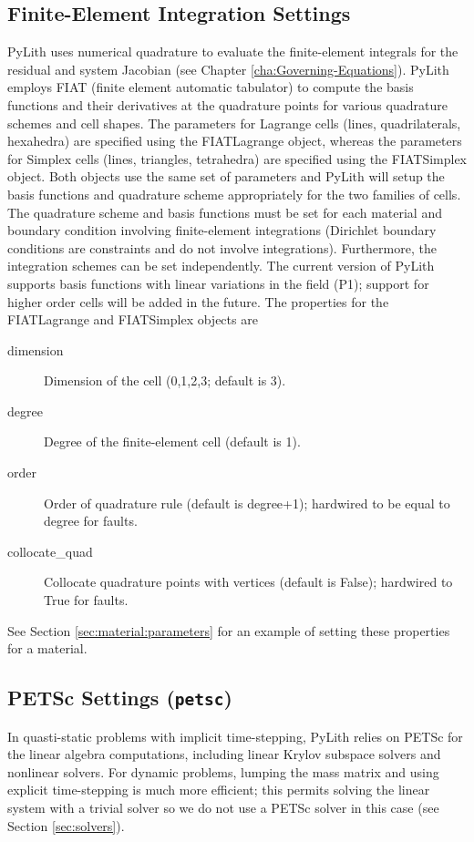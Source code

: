 \subsection{Finite-Element Integration Settings}

PyLith uses numerical quadrature to evaluate the finite-element integrals
for the residual and system Jacobian (see Chapter \vref{cha:Governing-Equations}).
PyLith employs FIAT (finite element automatic tabulator) to compute
the basis functions and their derivatives at the quadrature points
for various quadrature schemes and cell shapes. The parameters for
Lagrange cells (lines, quadrilaterals, hexahedra) are specified using
the FIATLagrange object, whereas the parameters for Simplex cells
(lines, triangles, tetrahedra) are specified using the FIATSimplex
object. Both objects use the same set of parameters and PyLith will
setup the basis functions and quadrature scheme appropriately for
the two families of cells. The quadrature scheme and basis functions
must be set for each material and boundary condition involving finite-element
integrations (Dirichlet boundary conditions are constraints and do
not involve integrations). Furthermore, the integration schemes can
be set independently. The current version of PyLith supports basis
functions with linear variations in the field (P1); support for higher
order cells will be added in the future. The properties for the FIATLagrange
and FIATSimplex objects are
\begin{description}
\item [{dimension}] Dimension of the cell (0,1,2,3; default is 3).
\item [{degree}] Degree of the finite-element cell (default is 1).
\item [{order}] Order of quadrature rule (default is degree+1); hardwired
to be equal to degree for faults.
\item [{collocate\_quad}] Collocate quadrature points with vertices (default
is False); hardwired to True for faults.
\end{description}
See Section \vref{sec:material:parameters} for an example of setting
these properties for a material.


\subsection{\label{sec:petsc:options}PETSc Settings (\texttt{petsc})}

In quasti-static problems with implicit time-stepping, PyLith relies
on PETSc for the linear algebra computations, including linear Krylov
subspace solvers and nonlinear solvers. For dynamic problems, lumping
the mass matrix and using explicit time-stepping is much more efficient;
this permits solving the linear system with a trivial solver so we
do not use a PETSc solver in this case (see Section \vref{sec:solvers}).

